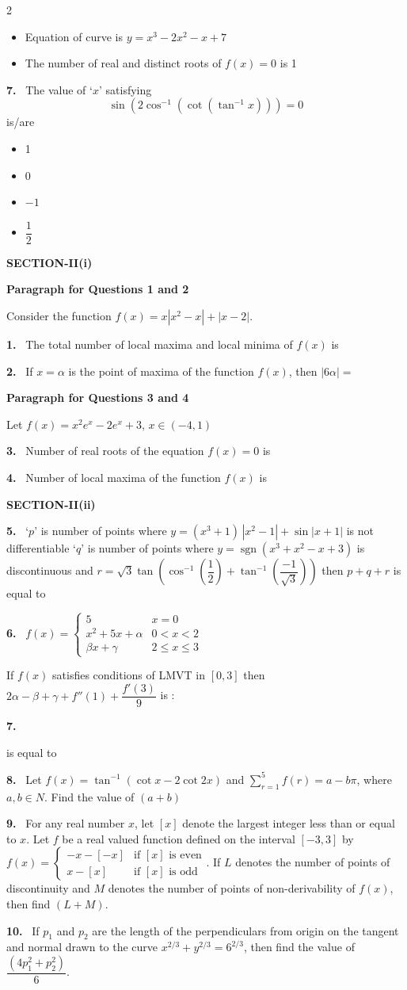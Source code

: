 \documentclass[10pt]{extarticle}
\newcommand{\sect}[1]{\par\smallskip\noindent\textbf{#1}\par}
\newcommand{\qn}[1]{\par\smallskip\noindent\textbf{#1.}~}
\newcommand{\paraq}[2]{\par\smallskip\noindent\textbf{Paragraph for Questions #1 and #2}\par}
\newenvironment{qoptions}{\begin{itemize}[leftmargin=1.8em,itemsep=1pt,topsep=2pt,label={}]}{\end{itemize}}
\newcommand{\opt}[2]{\item[(#1)] #2}
\begin{document}
\begin{multicols}{2}
\begin{qoptions}
\opt{C}{Equation of curve is $y=x^3-2x^2-x+7$}
\opt{D}{The number of real and distinct roots of $f(x)=0$ is 1}
\end{qoptions}
\qn{7} The value of `$x$' satisfying
\[\sin(2\cos^{-1}(\cot(\tan^{-1}x)))=0\]
is/are
\begin{qoptions}
\opt{A}{1}
\opt{B}{0}
\opt{C}{$-1$}
\opt{D}{$\dfrac12$}
\end{qoptions}
\sect{SECTION-II(i)}
\paraq{1}{2}
Consider the function $f(x)=x|x^2-x|+|x-2|$.
\qn{1} The total number of local maxima and local minima of $f(x)$ is
\qn{2} If $x=\alpha$ is the point of maxima of the function $f(x)$, then $|6\alpha|=$
\paraq{3}{4}
Let $f(x)=x^2e^x-2e^x+3$, $x\in(-4,1)$
\qn{3} Number of real roots of the equation $f(x)=0$ is
\qn{4} Number of local maxima of the function $f(x)$ is
\sect{SECTION-II(ii)}
\qn{5} `$p$' is number of points where $y=(x^3+1)\,|x^2-1|+\sin|x+1|$ is not differentiable `$q$' is number of points where $y=\operatorname{sgn}(x^3+x^2-x+3)$ is discontinuous and $r=\sqrt3\tan\left(\cos^{-1}\left(\dfrac12\right)+\tan^{-1}\left(\dfrac{-1}{\sqrt3}\right)\right)$ then $p+q+r$ is equal to
\qn{6} $f(x)=\begin{cases}5 & x=0\\ x^2+5x+\alpha & 0<x<2\\ \beta x+\gamma & 2\le x\le3\end{cases}$
\par
If $f(x)$ satisfies conditions of LMVT in $[0,3]$ then $2\alpha-\beta+\gamma+f''(1)+\dfrac{f'(3)}{9}$ is :
\qn{7}
\begin{center}\end{center}
is equal to
\qn{8} Let $f(x)=\tan^{-1}(\cot x-2\cot2x)$ and $\displaystyle\sum_{r=1}^{5}f(r)=a-b\pi$, where $a,b\in N$. Find the value of $(a+b)$
\qn{9} For any real number $x$, let $[x]$ denote the largest integer less than or equal to $x$. Let $f$ be a real valued function defined on the interval $[-3,3]$ by $f(x)=\begin{cases}-x-[-x] & \text{if }[x]\text{ is even}\\ x-[x] & \text{if }[x]\text{ is odd}\end{cases}$.
If $L$ denotes the number of points of discontinuity and $M$ denotes the number of points of non-derivability of $f(x)$, then find $(L+M)$.
\qn{10} If $p_1$ and $p_2$ are the length of the perpendiculars from origin on the tangent and normal drawn to the curve $x^{2/3}+y^{2/3}=6^{2/3}$, then find the value of $\dfrac{\left(4p_1^2+p_2^2\right)}{6}$.

\end{multicols}
\end{document}
